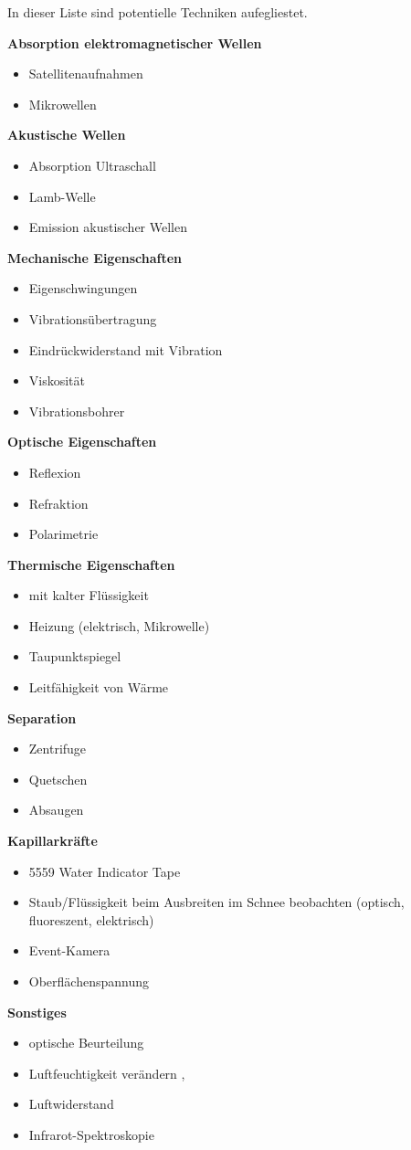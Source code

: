 In dieser Liste sind potentielle Techniken aufegliestet.

\textbf{Absorption elektromagnetischer Wellen}
\begin{itemize}

\item Satellitenaufnahmen
\item Mikrowellen
\end{itemize}



\textbf{Akustische Wellen}
\begin{itemize}
\item Absorption Ultraschall
\item Lamb-Welle \cite{lamb}
\item Emission akustischer Wellen
\end{itemize}


\textbf{Mechanische Eigenschaften}
\begin{itemize}
\item Eigenschwingungen
\item Vibrationsübertragung
\item Eindrückwiderstand mit Vibration
\item Viskosität
\item Vibrationsbohrer
\end{itemize}


\textbf{Optische Eigenschaften}
\begin{itemize}
\item Reflexion
\item Refraktion
\item Polarimetrie
\end{itemize}

\textbf{Thermische Eigenschaften}
\begin{itemize}
\item mit kalter Flüssigkeit
\item Heizung (elektrisch, Mikrowelle)
\item Taupunktspiegel
\item Leitfähigkeit von Wärme
\end{itemize}

\textbf{Separation}
\begin{itemize}
\item Zentrifuge
\item Quetschen
\item Absaugen
\end{itemize}

\textbf{Kapillarkräfte}
\begin{itemize}
\item 5559 Water Indicator Tape
\item Staub/Flüssigkeit beim Ausbreiten im Schnee beobachten (optisch, fluoreszent, elektrisch) \cite{kennedylabs-download}
\item Event-Kamera
\item Oberflächenspannung \cite{AlamShibly.2017}
\end{itemize}

\textbf{Sonstiges}
\begin{itemize}
\item optische Beurteilung \cite{miro}
\item Luftfeuchtigkeit verändern \cite{joule-thomson-wiki}, \cite{sensirion-sht4xa-sensors}
\item Luftwiderstand
\item Infrarot-Spektroskopie
\end{itemize}
